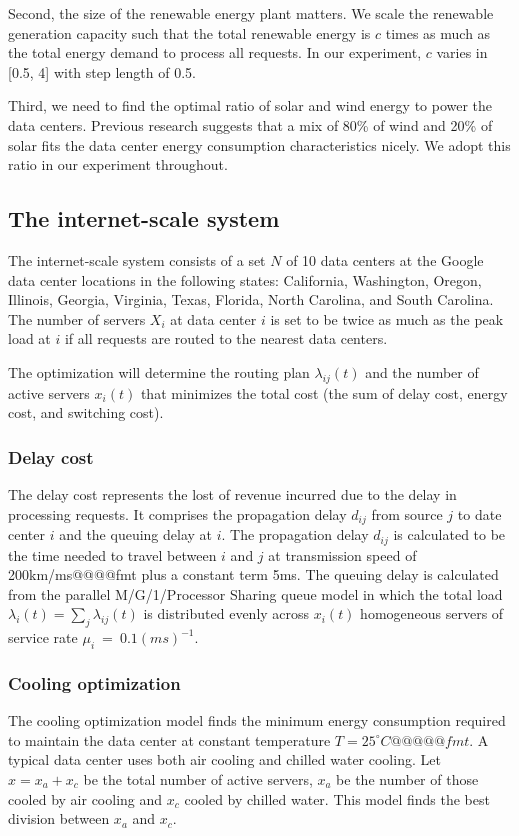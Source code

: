 \documentclass{acm_proc_article-sp}
\begin{document}
Second, the size of the renewable energy plant matters. We scale the renewable generation capacity such that the total renewable energy is $c$ times as much as the total energy demand to process all requests. In our experiment, $c$ varies in [0.5, 4] with step length of 0.5.  

Third, we need to find the optimal ratio of solar and wind energy to power the data centers. Previous research \cite{adam:GLB} suggests that a mix of 80\% of wind and 20\% of solar fits the data center energy consumption characteristics nicely. We adopt this ratio in our experiment throughout.

\subsection{The internet-scale system}
The internet-scale system consists of a set $N$ of 10 data centers at the Google data center locations in the following states: California, Washington, Oregon, Illinois, Georgia, Virginia, Texas, Florida, North Carolina, and South Carolina. The number of servers $X_i$ at data center $i$ is set to be twice as much as the peak load at $i$ if all requests are routed to the nearest data centers.

The optimization will determine the routing plan $\lambda_{ij}(t)$ and the number of active servers $x_i(t)$ that minimizes the total cost (the sum of delay cost, energy cost, and switching cost).

\subsubsection{Delay cost}
The delay cost represents the lost of revenue incurred due to the delay in processing requests. It comprises the propagation delay $d_{ij}$ from source $j$ to date center $i$ and the queuing delay at $i$.
The propagation delay $d_{ij}$ is calculated to be the time needed to travel between $i$ and $j$ at transmission speed of 200km/ms@@@@fmt plus a constant term 5ms. The queuing delay is calculated from the parallel M/G/1/Processor Sharing queue model in which the total load $\lambda_i(t)=\sum_j \lambda_{ij}(t)$ is distributed evenly across $x_i(t)$ homogeneous servers of service rate \mbox{$\mu_i$ = $0.1(ms)^{-1}$}.

\subsubsection{Cooling optimization}
The cooling optimization model finds the minimum energy consumption required to maintain the data center at constant temperature $T = 25^{\circ}C@@@@@fmt$. A typical data center uses both air cooling and chilled water cooling. Let $x = x_a + x_c$ be the total number of active servers, $x_a$ be the number of those cooled by air cooling and $x_c$ cooled by chilled water. This model finds the best division between $x_a$ and $x_c$. 
\end{document}
